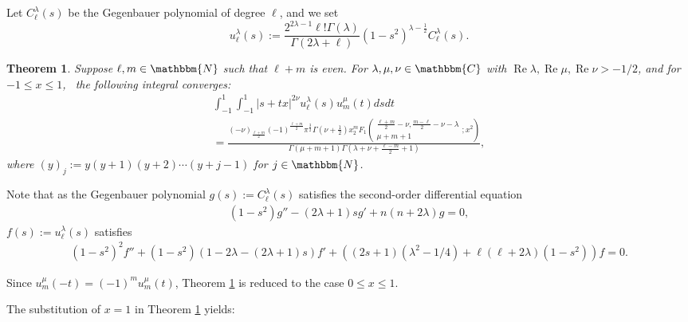 \documentclass{article}
\numberwithin{equation}{section}
\newcommand{\assign}{:=}
\newcommand{\tmop}[1]{\ensuremath{\operatorname{#1}}}
\newtheorem{theorem}[corollary]{Theorem}
\begin{document}
Let $C_{\ell}^{\lambda} (s)$ be the Gegenbauer polynomial of degree $\ell$,
and we set
\[ u_{\ell}^{\lambda} (s) \assign \frac{2^{2 \lambda - 1} \ell ! \Gamma
   (\lambda)}{\Gamma (2 \lambda + \ell)} (1 - s^2)^{\lambda - \frac{1}{2}}
   C_{\ell}^{\lambda} (s) . \]
\begin{theorem}
  \label{main-thm}Suppose $\ell, m \in \mathbbm{N}$ such that $\ell + m$ is
  even. For $\lambda, \mu, \nu \in \mathbbm{C}$ with $\tmop{Re} \lambda,
  \tmop{Re} \mu, \tmop{Re} \nu > - 1 / 2$, and for $- 1 \leqslant x \leqslant
  1$, \ the following integral converges:
  \begin{eqnarray}
    & \displaystyle\int_{- 1}^1 \displaystyle\int_{- 1}^1 | s + t x |^{2 \nu} u_{\ell}^{\lambda} (s)
    u_m^{\mu} (t) d s d t &  \nonumber\\
    & = \frac{(- \nu)_{\frac{\ell + m}{2}} (- 1)^{\frac{\ell + m}{2}}
    \pi^{\frac{3}{2}} \Gamma \left( \nu + \frac{1}{2} \right) x^m _2 F_1
    \left( \begin{array}{c}
      \frac{\ell + m}{2} - \nu, \frac{m - \ell}{2} - \nu - \lambda\\
      \mu + m + 1
    \end{array} ; x^2 \right)}{\Gamma (\mu + m + 1) \Gamma \left( \lambda +
    \nu + \frac{\ell - m}{2} + 1 \right)},  \label{eqn:main} & 
  \end{eqnarray}
  where $(y)_j \assign y (y + 1) (y + 2) \cdots (y + j - 1)$ for $j \in
  \mathbbm{N}$.
\end{theorem}

Note that as the Gegenbauer polynomial $g (s) \assign C_{\ell}^{\lambda} (s)$
satisfies the second-order differential equation
\begin{eqnarray}
  & (1 - s^2) g'' - (2 \lambda + 1) s g' + n (n + 2 \lambda) g = 0, & 
  \nonumber
\end{eqnarray}
$f (s) \assign u_{\ell}^{\lambda} (s)$ satisfies
\begin{eqnarray}
  & (1 - s^2)^2 f'' + (1 - s^2) (1 - 2 \lambda - (2 \lambda + 1) s) f' + ((2
  s + 1) (\lambda^2 - 1 / 4) + \ell (\ell + 2 \lambda) (1 - s^2)) f = 0. & 
  \nonumber
\end{eqnarray}
\begin{remark}
  Since $u_m^{\mu} (- t) = (- 1)^m u_m^{\mu} (t)$, Theorem \ref{main-thm} is
  reduced to the case $0 \leqslant x \leqslant 1$.
\end{remark}

The substitution of $x = 1$ in Theorem \ref{main-thm} yields:
\end{document}
